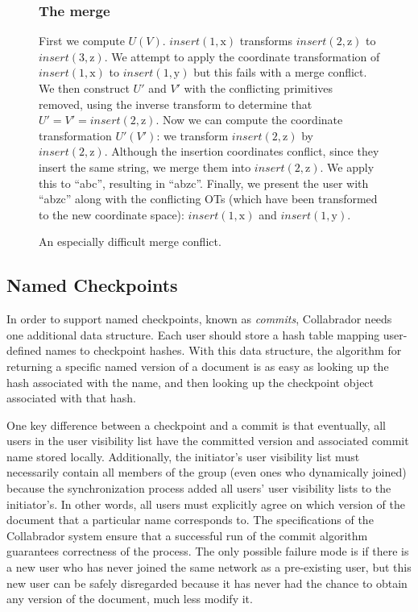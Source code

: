 \documentclass[11pt,titlepage]{article}
\begin{document}
\begin{figure}[ht]
\begin{minipage}{\textwidth}
\begin{multicols}{2}
      \subsubsection*{The merge}
      First we compute \(U(V)\). \(insert(1,\mathrm{x})\) transforms
      \(insert(2,\mathrm{z})\) to \(insert(3,\mathrm{z})\).  We
      attempt to apply the coordinate transformation of
      \(insert(1,\mathrm{x})\) to \(insert(1,\mathrm{y})\) but this
      fails with a merge conflict.  We then construct \(U'\) and
      \(V'\) with the conflicting primitives removed, using the
      inverse transform to determine that \(U' = V' = insert(2,
      \mathrm{z})\).  Now we can compute the coordinate transformation
      \(U'(V')\): we transform \(insert(2, \mathrm{z})\) by
      \(insert(2, \mathrm{z})\).  Although the insertion coordinates
      conflict, since they insert the same string, we merge them into
      \(insert(2, \mathrm{z})\).  We apply this to ``abc'', resulting
      in ``abzc''.  Finally, we present the user with ``abzc'' along
      with the conflicting OTs (which have been transformed to the new
      coordinate space): \(insert(1,\mathrm{x})\) and
      \(insert(1,\mathrm{y})\).
    \end{multicols}
  \end{minipage}
  \caption{An especially difficult merge conflict.}
  \label{fig:merge}
\end{figure}

\subsection{Named Checkpoints}

In order to support named checkpoints, known as \emph{commits},
Collabrador needs one additional data structure. Each user should
store a hash table mapping user-defined names to checkpoint hashes.
With this data structure, the algorithm for returning a specific named
version of a document is as easy as looking up the hash associated
with the name, and then looking up the checkpoint object associated
with that hash.

One key difference between a checkpoint and a commit is that
eventually, all users in the user visibility list have the committed
version and associated commit name stored locally. Additionally, the
initiator's user visibility list must necessarily contain all members
of the group (even ones who dynamically joined) because the
synchronization process added all users' user visibility lists to the
initiator's. In other words, all users must explicitly agree on which
version of the document that a particular name corresponds to.  The
specifications of the Collabrador system ensure that a successful run
of the commit algorithm guarantees correctness of the process. The
only possible failure mode is if there is a new user who has never
joined the same network as a pre-existing user, but this new user can
be safely disregarded because it has never had the chance to obtain
any version of the document, much less modify it.
\end{document}
